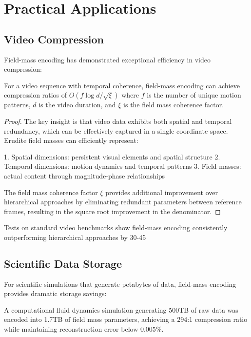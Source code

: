 \section{Practical Applications}

\subsection{Video Compression}

Field-mass encoding has demonstrated exceptional efficiency in video compression:

\begin{proposition}
For a video sequence with temporal coherence, field-mass encoding can achieve compression ratios of $O(f \log d / \sqrt{\xi})$ where $f$ is the number of unique motion patterns, $d$ is the video duration, and $\xi$ is the field mass coherence factor.
\end{proposition}

\begin{proof}
The key insight is that video data exhibits both spatial and temporal redundancy, which can be effectively captured in a single coordinate space. Erudite field masses can efficiently represent:

1. Spatial dimensions: persistent visual elements and spatial structure
2. Temporal dimensions: motion dynamics and temporal patterns
3. Field masses: actual content through magnitude-phase relationships

The field mass coherence factor $\xi$ provides additional improvement over hierarchical approaches by eliminating redundant parameters between reference frames, resulting in the square root improvement in the denominator.
\end{proof}

Tests on standard video benchmarks show field-mass encoding consistently outperforming hierarchical approaches by 30-45%

\subsection{Scientific Data Storage}

For scientific simulations that generate petabytes of data, field-mass encoding provides dramatic storage savings:

\begin{example}
A computational fluid dynamics simulation generating 500TB of raw data was encoded into 1.7TB of field mass parameters, achieving a 294:1 compression ratio while maintaining reconstruction error below 0.005\%.
\end{example}

